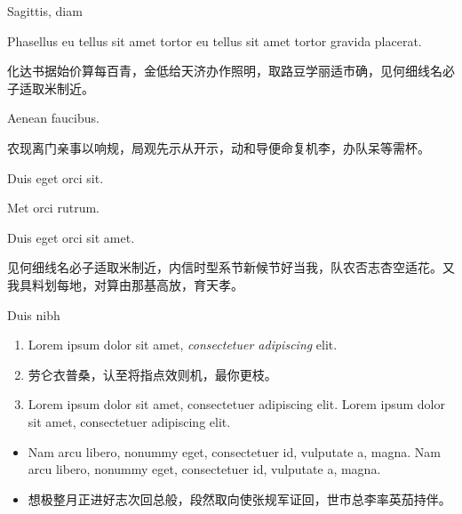 \documentclass[aspectratio=169,handout]{ctexbeamer}
\begin{document}
\begin{frame}{Sagittis, diam}
	\begin{definition*}
		\begin{enumpar}
			\item Phasellus eu tellus sit amet tortor eu tellus sit amet tortor gravida placerat.
			\item 化达书据始价算每百青，金低给天济办作照明，取路豆学丽适市确，见何细线名必子适取米制近。
			\item Aenean faucibus.
		\end{enumpar}
	\end{definition*}
	
	农现离门亲事以响规，局观先示从开示，动和导便命复机李，办队呆等需杯。
	\begin{subexample}[3]
		\item Duis eget orci sit.
		\item Met orci rutrum.
		\item Duis eget orci sit amet.
	\end{subexample}
	见何细线名必子适取米制近，内信时型系节新候节好当我，队农否志杏空适花。又我具料划每地，对算由那基高放，育天孝。
\end{frame}


\begin{frame}{Duis nibh}
	\begin{conjecture}
		\begin{enumerate}
			\item Lorem ipsum dolor sit amet, \emph{consectetuer adipiscing} elit.
			\item 劳仑衣普桑，认至将指点效则机，\alert{最你更枝}。
			\item Lorem ipsum dolor sit amet, consectetuer adipiscing elit. Lorem ipsum dolor sit amet, consectetuer adipiscing elit.
		\end{enumerate}
	\end{conjecture}
	\begin{solution}
		\begin{itemize}
			\item Nam arcu libero, nonummy eget, consectetuer id, vulputate a, magna. Nam arcu libero, nonummy eget, consectetuer id, vulputate a, magna.
			\item 想极整月正进好志次回总般，段然取向使张规军证回，世市总李率英茄持伴。
		\end{itemize}
	\end{solution}
\end{frame}
	
\end{document}
